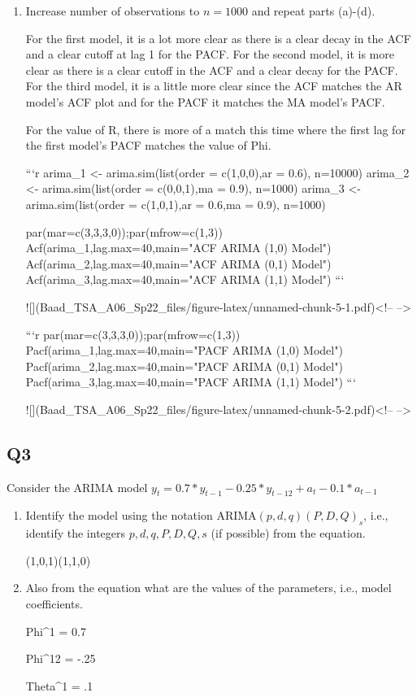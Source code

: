\documentclass[
]{article}
\begin{document}
\begin{enumerate}[label=(\alph*)]
\item Increase number of observations to $n=1000$ and repeat parts (a)-(d).

For the first model, it is a lot more clear as there is a clear decay in the ACF and a clear cutoff at lag 1 for the PACF. For the second model, it is more clear as there is a clear cutoff in the ACF and a clear decay for the PACF. For the third model, it is a little more clear since the ACF matches the AR model's ACF plot and for the PACF it matches the MA model's PACF.

For the value of R, there is more of a match this time where the first lag for the first model's PACF matches the value of Phi.


```r
arima_1 <- arima.sim(list(order = c(1,0,0),ar = 0.6), n=10000)
arima_2 <- arima.sim(list(order = c(0,0,1),ma = 0.9), n=1000)
arima_3 <- arima.sim(list(order = c(1,0,1),ar = 0.6,ma = 0.9), n=1000)

par(mar=c(3,3,3,0));par(mfrow=c(1,3))
Acf(arima_1,lag.max=40,main="ACF ARIMA (1,0) Model")
Acf(arima_2,lag.max=40,main="ACF ARIMA (0,1) Model")
Acf(arima_3,lag.max=40,main="ACF ARIMA (1,1) Model")
```

![](Baad_TSA_A06_Sp22_files/figure-latex/unnamed-chunk-5-1.pdf)<!-- --> 

```r
par(mar=c(3,3,3,0));par(mfrow=c(1,3))
Pacf(arima_1,lag.max=40,main="PACF ARIMA (1,0) Model")
Pacf(arima_2,lag.max=40,main="PACF ARIMA (0,1) Model")
Pacf(arima_3,lag.max=40,main="PACF ARIMA (1,1) Model")
```

![](Baad_TSA_A06_Sp22_files/figure-latex/unnamed-chunk-5-2.pdf)<!-- --> 

\end{enumerate}

\hypertarget{q3}{%
\subsection{Q3}\label{q3}}

Consider the ARIMA model
\(y_t=0.7*y_{t-1}-0.25*y_{t-12}+a_t-0.1*a_{t-1}\)

\begin{enumerate}[label=(\alph*)]

\item Identify the model using the notation ARIMA$(p,d,q)(P,D,Q)_ s$, i.e., identify the integers $p,d,q,P,D,Q,s$ (if possible) from the equation.

(1,0,1)(1,1,0)

\item Also from the equation what are the values of the parameters, i.e., model coefficients. 

Phi^1 = 0.7

Phi^12 = -.25

Theta^1 = .1

\end{enumerate}
\end{document}
